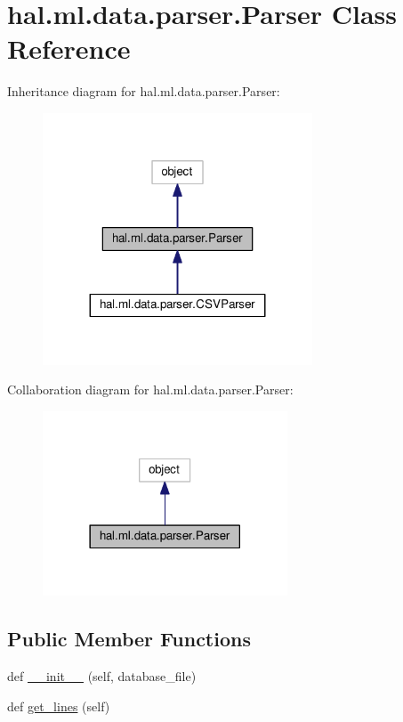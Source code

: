 \hypertarget{classhal_1_1ml_1_1data_1_1parser_1_1_parser}{}\section{hal.\+ml.\+data.\+parser.\+Parser Class Reference}
\label{classhal_1_1ml_1_1data_1_1parser_1_1_parser}


Inheritance diagram for hal.\+ml.\+data.\+parser.\+Parser\+:\nopagebreak
\begin{figure}[H]
\begin{center}
\leavevmode
\includegraphics[width=227pt]{classhal_1_1ml_1_1data_1_1parser_1_1_parser__inherit__graph}
\end{center}
\end{figure}


Collaboration diagram for hal.\+ml.\+data.\+parser.\+Parser\+:\nopagebreak
\begin{figure}[H]
\begin{center}
\leavevmode
\includegraphics[width=206pt]{classhal_1_1ml_1_1data_1_1parser_1_1_parser__coll__graph}
\end{center}
\end{figure}
\subsection*{Public Member Functions}
\begin{DoxyCompactItemize}
\item 
def \hyperlink{classhal_1_1ml_1_1data_1_1parser_1_1_parser_adc7a4812823d9c636eb8977c6d450e6a}{\+\_\+\+\_\+init\+\_\+\+\_\+} (self, database\+\_\+file)
\item 
def \hyperlink{classhal_1_1ml_1_1data_1_1parser_1_1_parser_aaf10b0c434100a1c3effd5e5ee0ee2a3}{get\+\_\+lines} (self)
\end{DoxyCompactItemize}
